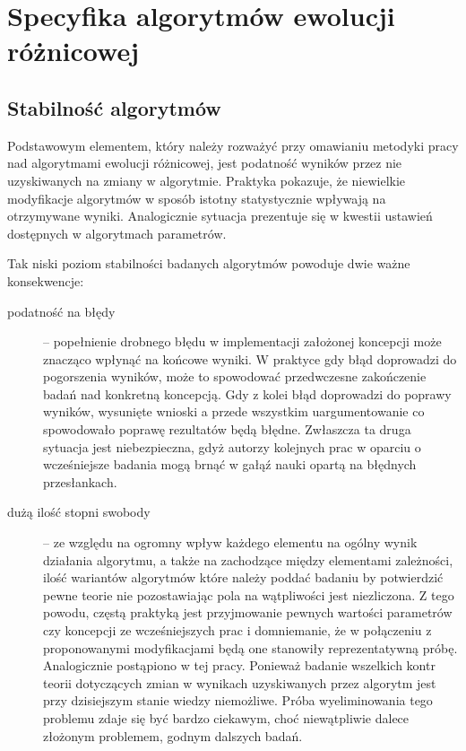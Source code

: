 \documentclass[12pt,a4paper]{report}
\begin{document}
{{{{{{{\section{Specyfika algorytmów ewolucji różnicowej}
\subsection{Stabilność algorytmów}
\par{
Podstawowym elementem, który należy rozważyć przy omawianiu metodyki pracy nad algorytmami ewolucji różnicowej, jest podatność wyników przez nie uzyskiwanych na zmiany w algorytmie. Praktyka pokazuje, że niewielkie modyfikacje algorytmów w sposób istotny statystycznie wpływają na otrzymywane wyniki. Analogicznie sytuacja prezentuje się w kwestii ustawień dostępnych w algorytmach parametrów.
}
\par{
Tak niski poziom stabilności badanych algorytmów powoduje dwie ważne konsekwencje:
\begin{description}
\item[podatność na błędy] -- popełnienie drobnego błędu w implementacji założonej koncepcji może znacząco wpłynąć na końcowe wyniki. W praktyce gdy błąd doprowadzi do pogorszenia wyników, może to spowodować przedwczesne zakończenie badań nad konkretną koncepcją. Gdy z kolei błąd doprowadzi do poprawy wyników, wysunięte wnioski a przede wszystkim uargumentowanie co spowodowało poprawę rezultatów będą błędne. Zwłaszcza ta druga sytuacja jest niebezpieczna, gdyż autorzy kolejnych prac w oparciu o wcześniejsze badania mogą brnąć w gałąź nauki opartą na błędnych przesłankach.
\item[dużą ilość stopni swobody] -- ze względu na ogromny wpływ każdego elementu na ogólny wynik działania algorytmu, a także na zachodzące między elementami zależności, ilość wariantów algorytmów które należy poddać badaniu by potwierdzić pewne teorie nie pozostawiając pola na wątpliwości jest niezliczona. Z tego powodu, częstą praktyką jest przyjmowanie pewnych wartości parametrów czy koncepcji ze wcześniejszych prac i domniemanie, że w połączeniu z proponowanymi modyfikacjami będą one stanowiły reprezentatywną próbę. Analogicznie postąpiono w tej pracy. Ponieważ badanie wszelkich kontr teorii dotyczących zmian w wynikach uzyskiwanych przez algorytm jest przy dzisiejszym stanie wiedzy niemożliwe. Próba wyeliminowania tego problemu zdaje się być bardzo ciekawym, choć niewątpliwie dalece złożonym problemem, godnym dalszych badań.
\end{description}
}
}}}}}}}
\end{document}

